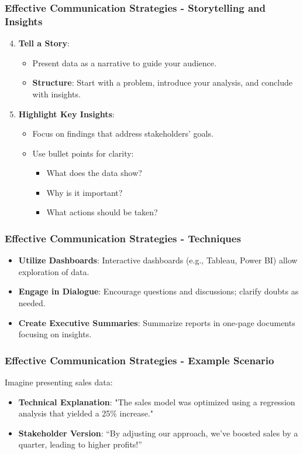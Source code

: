 \documentclass{beamer}
\begin{document}
\begin{frame}[fragile]
    \frametitle{Effective Communication Strategies - Storytelling and Insights}
    \begin{enumerate}
        \setcounter{enumi}{3}
        \item \textbf{Tell a Story}:
        \begin{itemize}
            \item Present data as a narrative to guide your audience.
            \item \textbf{Structure}: Start with a problem, introduce your analysis, and conclude with insights.
        \end{itemize}
        
        \item \textbf{Highlight Key Insights}:
        \begin{itemize}
            \item Focus on findings that address stakeholders' goals.
            \item Use bullet points for clarity:
            \begin{itemize}
                \item What does the data show?
                \item Why is it important?
                \item What actions should be taken?
            \end{itemize}
        \end{itemize}
    \end{enumerate}
\end{frame}

\begin{frame}[fragile]
    \frametitle{Effective Communication Strategies - Techniques}
    \begin{itemize}
        \item \textbf{Utilize Dashboards}: Interactive dashboards (e.g., Tableau, Power BI) allow exploration of data.
        \item \textbf{Engage in Dialogue}: Encourage questions and discussions; clarify doubts as needed.
        \item \textbf{Create Executive Summaries}: Summarize reports in one-page documents focusing on insights.
    \end{itemize}
\end{frame}

\begin{frame}[fragile]
    \frametitle{Effective Communication Strategies - Example Scenario}
    Imagine presenting sales data:
    \begin{itemize}
        \item \textbf{Technical Explanation}: "The sales model was optimized using a regression analysis that yielded a 25\% increase."
        \item \textbf{Stakeholder Version}: “By adjusting our approach, we've boosted sales by a quarter, leading to higher profits!”
    \end{itemize}
\end{frame}
\end{document}
